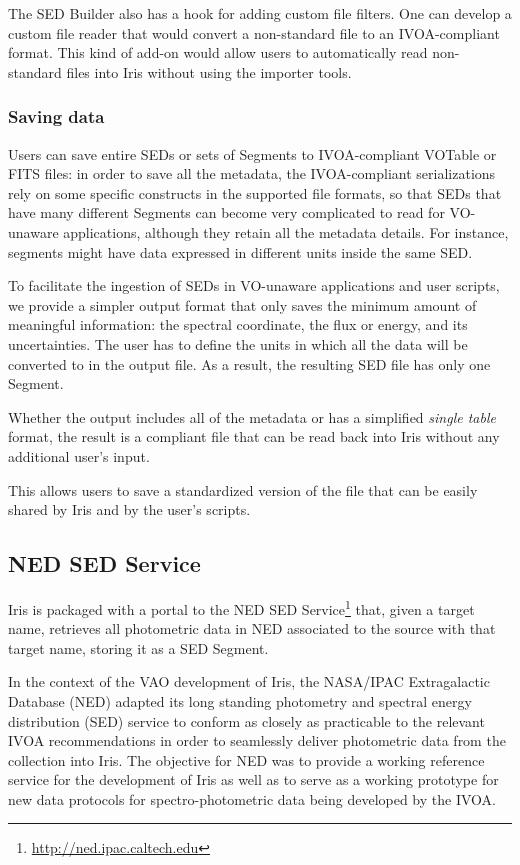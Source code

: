 \documentclass[final,5p,authoryear]{elsarticle}
\begin{document}
The SED Builder also has a hook for adding custom file filters. One can develop
a custom file reader that would convert a non-standard file to an IVOA-compliant
format. This kind of add-on would allow users to automatically read non-standard
files into Iris without using the importer tools.

\subsubsection{Saving data} Users can save entire SEDs or sets of Segments to
IVOA-compliant VOTable or FITS files: in order to save all the metadata, the
IVOA-compliant serializations rely on some specific constructs in the supported
file formats, so that SEDs that have many different Segments can become very
complicated to read for VO-unaware applications, although they retain all the
metadata details. For instance, segments might have data expressed in different
units inside the same SED.

To facilitate the ingestion of SEDs in VO-unaware applications and user scripts,
we provide a simpler output format that only saves the minimum amount of
meaningful information: the spectral coordinate, the flux or energy, and its
uncertainties. The user has to define the units in which all the data will be
converted to in the output file. As a result, the resulting SED file has only
one Segment.

Whether the output includes all of the metadata or has a simplified \emph{single
table} format, the result is a compliant file that can be read back into Iris
without any additional user's input.

This allows users to save a standardized version of the file that can be easily
shared by Iris and by the user's scripts.

\subsection{NED SED Service} \label{subsec:ned}

Iris is packaged with a portal to the NED SED
Service\footnote{\url{http://ned.ipac.caltech.edu}} that, given a target name,
retrieves all photometric data in NED associated to the source with that target
name, storing it as a SED Segment.

In the context of the VAO development of Iris, the NASA/IPAC Extragalactic
Database (NED) adapted its long standing photometry and spectral energy
distribution (SED) service to conform as closely as practicable to the relevant
IVOA recommendations in order to seamlessly deliver photometric data from the
collection into Iris. The objective for NED was to provide a working reference
service for the development of Iris as well as to serve as a working prototype
for new data protocols for spectro-photometric data being developed by the IVOA.
\end{document}
